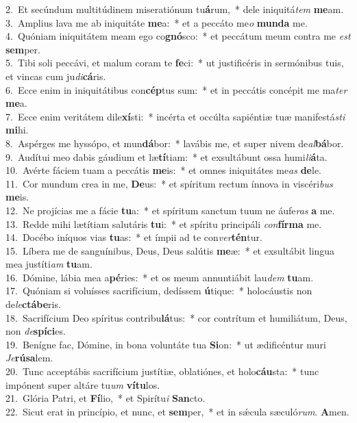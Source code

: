 {2.~}Et secúndum multitúdinem miseratiónum tu\textbf{á}rum,~* dele iniquitá\textit{tem} \textbf{me}am.\\
{3.~}Amplius lava me ab iniquitáte \textbf{me}a:~* et a peccáto me\textit{o} \textbf{mun}\textbf{da} me.\\
{4.~}Quóniam iniquitátem meam ego co\textbf{gnó}sco:~* et peccátum meum contra me \textit{est} \textbf{sem}per.\\
{5.~}Tibi soli peccávi, et malum coram te \textbf{fe}ci:~* ut justificéris in sermónibus tuis, et vincas cum ju\textit{di}\textbf{cá}ris.\\
{6.~}Ecce enim in iniquitátibus con\textbf{cép}tus sum:~* et in peccátis concépit me ma\textit{ter} \textbf{me}a.\\
{7.~}Ecce enim veritátem dile\textbf{xí}sti:~* incérta et occúlta sapiéntiæ tuæ manifestá\textit{sti} \textbf{mi}hi.\\
{8.~}Aspérges me hyssópo, et mun\textbf{dá}bor:~* lavábis me, et super nivem de\textit{al}\textbf{bá}bor.\\
{9.~}Audítui meo dabis gáudium et læ\textbf{tí}tiam:~* et exsultábunt ossa humi\textit{li}\textbf{á}ta.\\
{10.~}Avérte fáciem tuam a peccátis \textbf{me}is:~* et omnes iniquitátes me\textit{as} \textbf{de}le.\\
{11.~}Cor mundum crea in me, \textbf{De}us:~* et spíritum rectum ínnova in viscéri\textit{bus} \textbf{me}is.\\
{12.~}Ne projícias me a fácie \textbf{tu}a:~* et spíritum sanctum tuum ne áufe\textit{ras} \textbf{a} me.\\
{13.~}Redde mihi lætítiam salutáris \textbf{tu}i:~* et spíritu principáli \textit{con}\textbf{fír}\textbf{ma} me.\\
{14.~}Docébo iníquos vias \textbf{tu}as:~* et ímpii ad te con\textit{ver}\textbf{tén}tur.\\
{15.~}Líbera me de sanguínibus, Deus, Deus salútis \textbf{me}æ:~* et exsultábit lingua mea justíti\textit{am} \textbf{tu}am.\\
{16.~}Dómine, lábia mea a\textbf{pé}ries:~* et os meum annuntiábit lau\textit{dem} \textbf{tu}am.\\
{17.~}Quóniam si voluísses sacrifícium, dedíssem \textbf{ú}tique:~* holocáustis non de\textit{le}\textbf{ctá}\textbf{be}ris.\\
{18.~}Sacrifícium Deo spíritus contribu\textbf{lá}tus:~* cor contrítum et humiliátum, Deus, non \textit{de}\textbf{spí}\textbf{ci}es.\\
{19.~}Benígne fac, Dómine, in bona voluntáte tua \textbf{Si}on:~* ut ædificéntur muri \textit{Je}\textbf{rú}\textbf{sa}lem.\\
{20.~}Tunc acceptábis sacrifícium justítiæ, oblatiónes, et holo\textbf{cáu}sta:~* tunc impónent super altáre tu\textit{um} \textbf{ví}\textbf{tu}los.\\
{21.~}Glória Patri, et \textbf{Fí}lio,~* et Spirítu\textit{i} \textbf{San}cto.\\
{22.~}Sicut erat in princípio, et nunc, et \textbf{sem}per,~* et in sǽcula sæculó\textit{rum}. \textbf{A}men.\\
